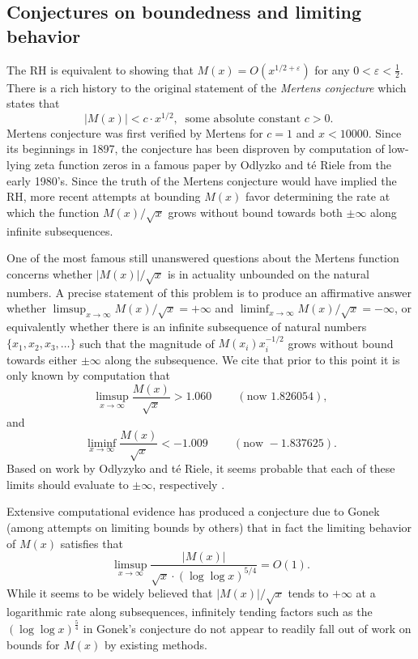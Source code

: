 \documentclass[11pt,reqno,a4letter]{article}
\numberwithin{figure}{section}
\numberwithin{table}{section}
\newcommand{\cf}{\textit{cf.\ }}
\theoremstyle{plain}
\numberwithin{theorem}{section}
\theoremstyle{definition}
\begin{document}
\subsection{Conjectures on boundedness and limiting behavior} 

The RH is equivalent to showing that 
$M(x) = O\left(x^{1/2+\varepsilon}\right)$ for any 
$0 < \varepsilon < \frac{1}{2}$. 
There is a rich history to the original statement of the \emph{Mertens conjecture} which 
states that 
\[ 
|M(x)| < c \cdot x^{1/2},\ \text{ some absolute constant $c > 0$. }
\] 
Mertens conjecture was first verified by Mertens for $c = 1$ and $x < 10000$. 
Since its beginnings in 1897, the conjecture has been disproven by computation 
of low-lying zeta function zeros in a famous paper by 
Odlyzko and t\'{e} Riele from the early 1980's. 
Since the truth of the Mertens conjecture would have implied the RH, more recent attempts 
at bounding $M(x)$ favor determining the rate at which the function 
$M(x) / \sqrt{x}$ grows without bound towards both $\pm \infty$ along infinite 
subsequences. 

One of the most famous still unanswered questions about the Mertens 
function concerns whether $|M(x)| / \sqrt{x}$ is in actuality unbounded on the 
natural numbers. A precise statement of this 
problem is to produce an affirmative answer whether 
$\limsup_{x \rightarrow \infty} M(x) / \sqrt{x} = +\infty$ and 
$\liminf_{x \rightarrow \infty} M(x) / \sqrt{x} = -\infty$, or 
equivalently whether there is an infinite subsequence of natural numbers 
$\{x_1, x_2, x_3, \ldots\}$ such that the magnitude of 
$M(x_i) x_i^{-1/2}$ grows without bound towards either $\pm \infty$ 
along the subsequence. 
We cite that prior to this point it is only known by computation 
that \cite[\cf \S 4.1]{PRIMEREC} 
\[
\limsup_{x\rightarrow\infty} \frac{M(x)}{\sqrt{x}} > 1.060\ \qquad (\text{now } 1.826054), 
\] 
and 
\[ 
\liminf_{x\rightarrow\infty} \frac{M(x)}{\sqrt{x}} < -1.009\ \qquad (\text{now } -1.837625). 
\] 
Based on work by Odlyzyko and t\'{e} Riele, it seems probable that 
each of these limits should evaluate to $\pm \infty$, respectively 
\cite{ODLYZ-TRIELE,MREVISITED,ORDER-MERTENSFN,HURST-2017}. 

Extensive computational evidence has produced 
a conjecture due to Gonek (among attempts on limiting bounds by others) that in fact the limiting behavior of 
$M(x)$ satisfies 
that $$\limsup_{x \rightarrow \infty} \frac{|M(x)|}{\sqrt{x} \cdot 
(\log\log x)^{5/4}} = O(1).$$ 
While it seems to be widely believed that $|M(x)| / \sqrt{x}$ tends to $+\infty$ at a logarithmic rate 
along subsequences, infinitely tending factors such as the $(\log\log x)^{\frac{5}{4}}$ in Gonek's conjecture 
do not appear to readily fall out of work on bounds for $M(x)$ by existing methods. 
\end{document}
